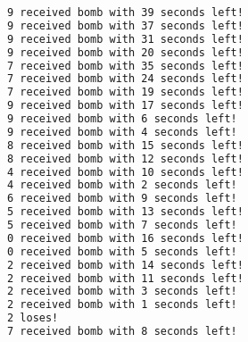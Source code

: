 \documentclass{article}
\begin{document}
\begin{lstlisting}[language=bash]
9 received bomb with 39 seconds left!
9 received bomb with 37 seconds left!
9 received bomb with 31 seconds left!
9 received bomb with 20 seconds left!
7 received bomb with 35 seconds left!
7 received bomb with 24 seconds left!
7 received bomb with 19 seconds left!
9 received bomb with 17 seconds left!
9 received bomb with 6 seconds left!
9 received bomb with 4 seconds left!
8 received bomb with 15 seconds left!
8 received bomb with 12 seconds left!
4 received bomb with 10 seconds left!
4 received bomb with 2 seconds left!
6 received bomb with 9 seconds left!
5 received bomb with 13 seconds left!
5 received bomb with 7 seconds left!
0 received bomb with 16 seconds left!
0 received bomb with 5 seconds left!
2 received bomb with 14 seconds left!
2 received bomb with 11 seconds left!
2 received bomb with 3 seconds left!
2 received bomb with 1 seconds left!
2 loses!
7 received bomb with 8 seconds left!
\end{lstlisting}
\end{document}
